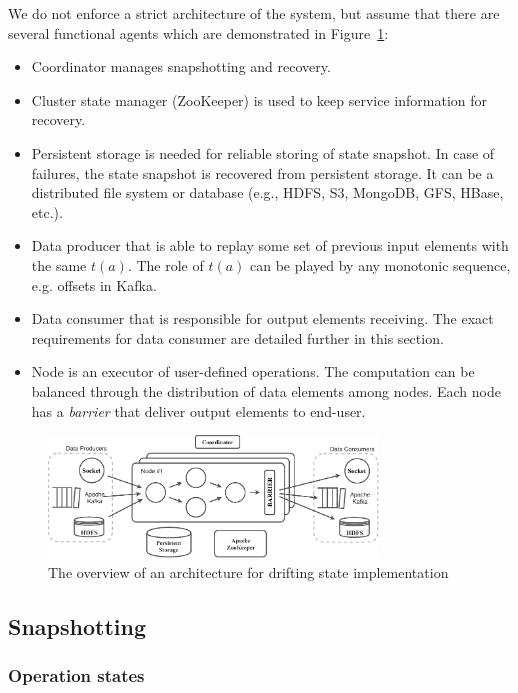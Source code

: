 We do not enforce a strict architecture of the system, but assume that there are several functional agents which are demonstrated in Figure~\ref{arch}:
\begin{itemize}
    \item Coordinator manages snapshotting and recovery.
    \item Cluster state manager (ZooKeeper) is used to keep service information for recovery.
    \item Persistent storage is needed for reliable storing of state snapshot. In case of failures, the state snapshot is recovered from persistent storage. It can be a distributed file system or database (e.g., HDFS, S3, MongoDB, GFS, HBase, etc.).
    \item Data producer that is able to replay some set of previous input elements with the same $t(a)$. The role of $t(a)$ can be played by any monotonic sequence, e.g. offsets in Kafka.
    \item Data consumer that is responsible for output elements receiving. The exact requirements for data consumer are detailed further in this section.
    \item Node is an executor of user-defined operations. The computation can be balanced through the distribution of data elements among nodes. Each node has a {\em barrier} that deliver output elements to end-user.
\end{itemize}

\begin{figure}[tbp]
  \centering
  \includegraphics[width=0.78\textwidth]{pics/arch}
  \caption{The overview of an architecture for drifting state implementation}
  \label {arch}
\end{figure}

\subsection{Snapshotting}

\subsubsection{Operation states}

